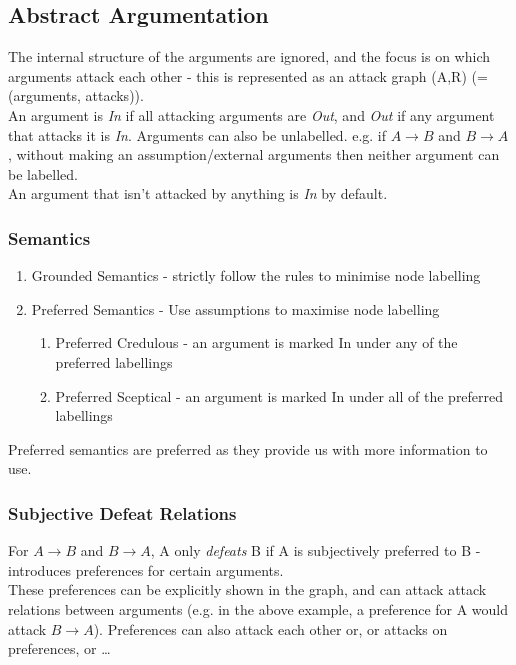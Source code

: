 \subsection{Abstract Argumentation}
The internal structure of the arguments are ignored, and the focus is on which arguments attack each other - this is represented as an attack graph (A,R) (= (arguments, attacks)).\\

An argument is \emph{In} if all attacking arguments are \emph{Out}, and \emph{Out} if any argument that attacks it is \emph{In}. Arguments can also be unlabelled. e.g. if $A\rightarrow{B}$ and $B\rightarrow{A}$, without making an assumption/external arguments then neither argument can be labelled.\\

An argument that isn't attacked by anything is \emph{In} by default. 

\subsubsection{Semantics}
    \begin{enumerate}
        \item Grounded Semantics - strictly follow the rules to minimise node labelling
        \item Preferred Semantics - Use assumptions to maximise node labelling
        \begin{enumerate}
            \item Preferred Credulous - an argument is marked In under any of the preferred labellings
            \item Preferred Sceptical - an argument is marked In under all of the preferred labellings
        \end{enumerate}
    \end{enumerate}

Preferred semantics are preferred as they provide us with more information to use.

\subsubsection{Subjective Defeat Relations}
For $A\rightarrow{B}$ and $B\rightarrow{A}$, A only \emph{defeats} B if A is subjectively preferred to B - introduces preferences for certain arguments.\\
These preferences can be explicitly shown in the graph, and can attack attack relations between arguments (e.g. in the above example, a preference for A would attack $B\rightarrow{A}$). Preferences can also attack each other or, or attacks on preferences, or \dots 

